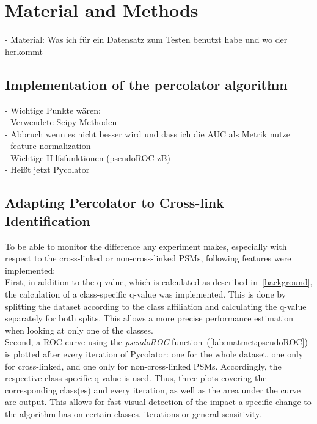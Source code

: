 
\chapter{Material and Methods}
\label{matmet}

- Material: Was ich für ein Datensatz zum Testen benutzt habe und wo der herkommt
\label{lab:matmet:dataset}

\section{Implementation of the percolator algorithm}
- Wichtige Punkte wären:\\
- Verwendete Scipy-Methoden\\
- Abbruch wenn es nicht besser wird und dass ich die AUC als Metrik nutze\\
- \label{lab:matmet:normalization} feature normalization\\
- \label{lab:matmet:pseudoROC}Wichtige Hilfsfunktionen (pseudoROC zB)\\
- Heißt jetzt Pycolator

\section{Adapting Percolator to Cross-link Identification}
To be able to monitor the difference any experiment makes, especially with respect to the cross-linked or non-cross-linked PSMs, following features were implemented:\\
First, in addition to the q-value, which is calculated as described in~\ref{background}, the calculation of a class-specific q-value was implemented. This is done by splitting the dataset according to the class affiliation and calculating the q-value separately for both splits. This allows a more precise performance estimation when looking at only one of the classes.\\
\label{lab:matmet:rocs_after_every_iteration}
Second, a ROC curve using the \emph{pseudoROC} function~(\ref{lab:matmet:pseudoROC}) is plotted after every iteration of Pycolator: one for the whole dataset, one only for cross-linked, and one only for non-cross-linked PSMs. Accordingly, the respective class-specific q-value is used. Thus, three plots covering the corresponding class(es) and every iteration, as well as the area under the curve are output. This allows for fast visual detection of the impact a specific change to the algorithm has on certain classes, iterations or general sensitivity.
